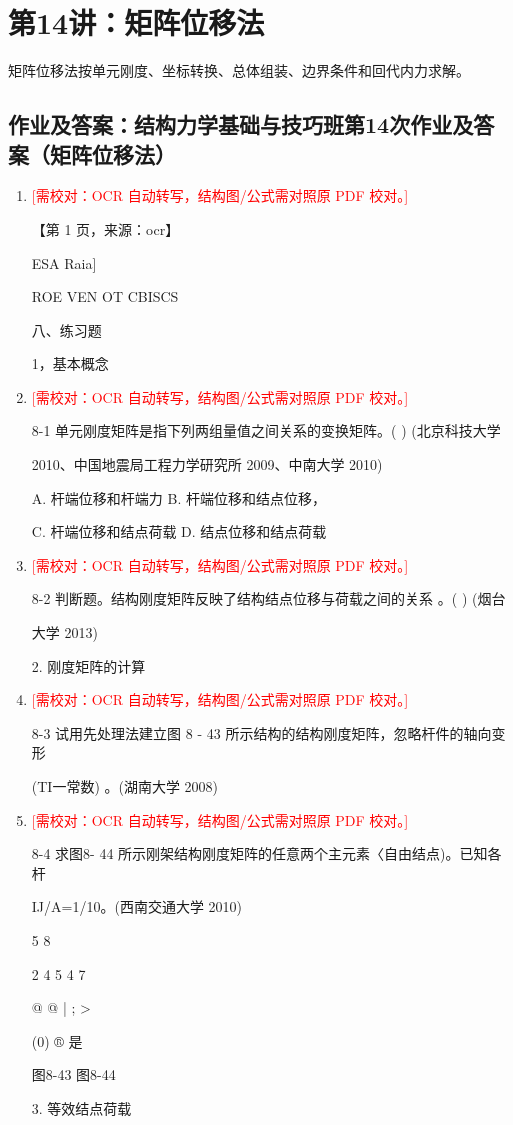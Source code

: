 \documentclass[UTF8,12pt,a4paper,openany]{ctexbook}
\newcommand{\TODO}[1]{\textcolor{red}{[需校对：#1]}}
\begin{document}
\chapter{第14讲：矩阵位移法}
\begin{tcolorbox}[title=解析总览]
矩阵位移法按单元刚度、坐标转换、总体组装、边界条件和回代内力求解。
\end{tcolorbox}
\section{作业及答案：结构力学基础与技巧班第14次作业及答案（矩阵位移法）}
\begin{enumerate}[label=\textbf{\arabic*.},leftmargin=2em]
\item \TODO{OCR 自动转写，结构图/公式需对照原 PDF 校对。}\par 【第 1 页，来源：ocr】\par ESA Raia]\par ROE VEN OT CBISCS\par 八、练习题\par 1，基本概念
\item \TODO{OCR 自动转写，结构图/公式需对照原 PDF 校对。}\par 8-1 单元刚度矩阵是指下列两组量值之间关系的变换矩阵。( ) (北京科技大学\par 2010、中国地震局工程力学研究所 2009、中南大学 2010)\par A. 杆端位移和杆端力             B. 杆端位移和结点位移，\par C. 杆端位移和结点荷载           D. 结点位移和结点荷载
\item \TODO{OCR 自动转写，结构图/公式需对照原 PDF 校对。}\par 8-2 判断题。结构刚度矩阵反映了结构结点位移与荷载之间的关系 。( ) (烟台\par 大学 2013)\par 2. 刚度矩阵的计算
\item \TODO{OCR 自动转写，结构图/公式需对照原 PDF 校对。}\par 8-3 试用先处理法建立图 8 - 43 所示结构的结构刚度矩阵，忽略杆件的轴向变形\par (TI一常数) 。(湖南大学 2008)
\item \TODO{OCR 自动转写，结构图/公式需对照原 PDF 校对。}\par 8-4 求图8- 44 所示刚架结构刚度矩阵的任意两个主元素〈自由结点)。已知各杆\par IJ/A=1/10。(西南交通大学 2010)\par 5          8\par 2        4       5            4         7\par @         @   |        ;         >\par (0)       ®       是\par 图8-43                     图8-44\par 3. 等效结点荷载

\end{enumerate}
\end{document}
